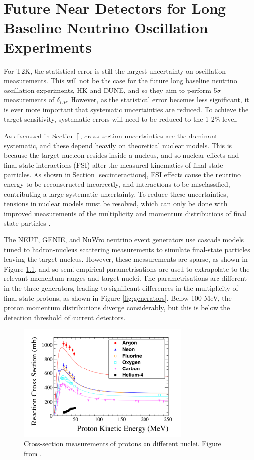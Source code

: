 \chapter{Future Near Detectors for Long Baseline Neutrino Oscillation Experiments}\label{sec:hptpc}

For T2K, the statistical error is still the largest uncertainty on oscillation measurements. This will not be the case for the future long baseline neutrino oscillation experiments, HK and DUNE, and so they aim to perform 5$\sigma$ measurements of $\delta_{CP}$. However, as the statistical error becomes less significant, it is ever more important that systematic uncertainties are reduced. To achieve the target sensitivity, systematic errors will need to be reduced to the 1-2$\%$ level.

As discussed in Section \ref{}, cross-section uncertainties are the dominant systematic, and these depend heavily on theoretical nuclear models. This is because the target nucleon resides inside a nucleus, and so nuclear effects and final state interactions (FSI) alter the measured kinematics of final state particles. As shown in Section \ref{sec:interactions}, FSI effects cause the neutrino energy to be reconstructed incorrectly, and interactions to be misclassified, contributing a large systematic uncertainty. To reduce these uncertainties, tensions in nuclear models must be resolved, which can only be done with improved measurements of the multiplicity and momentum distributions of final state particles \cite{nustecscat}.

The NEUT, GENIE, and NuWro \cite{nuwro} neutrino event generators use cascade models tuned to hadron-nucleus scattering measurements to simulate final-state particles leaving the target nucleus. However, these measurements are sparse, as shown in Figure \ref{fig:nucxsec}, and so semi-empirical parametrisations are used to extrapolate to the relevant momentum ranges and target nuclei. The parametrisations are different in the three generators, leading to significant differences in the multiplicity of final state protons, as shown in Figure \ref{fig:generators}. Below 100 MeV, the proton momentum distributions diverge considerably, but this is below the detection threshold of current detectors.

\begin{figure}
\centering
\includegraphics*[width=0.75\textwidth,clip]{figs/nucxsec}
\caption{Cross-section measurements of protons on different nuclei. Figure from \cite{hptpcprop}.}\label{fig:nucxsec}
\end{figure}


